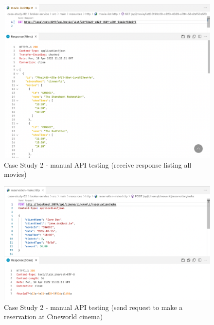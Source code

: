 \begin{figure}[H]
	\centering
	\includegraphics[width=1.0\linewidth]{./assets/images/case-studies/cs02-manual-2.png}
	\caption{Case Study 2 - manual API testing (receive response listing all movies)}
    \label{fig:cs02-manual-2}
\end{figure}

\begin{figure}[H]
	\centering
	\includegraphics[width=1.0\linewidth]{./assets/images/case-studies/cs02-manual-3.png}
	\caption{Case Study 2 - manual API testing (send request to make a reservation at Cineworld cinema)}
	\label{fig:cs02-manual-3}
\end{figure}

